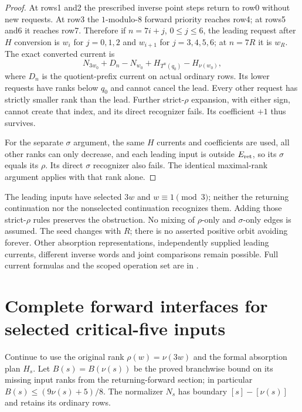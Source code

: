 \documentclass[11pt]{article}
\begin{document}
\begin{proof}
At rows1 and2 the prescribed inverse point steps return to row0 without
new requests. At row3 the $1$-modulo-$8$ forward priority reaches row4;
at rows5 and6 it reaches row7. Therefore if $n=7i+j$, $0\le j\le6$,
the leading request after $H$ conversion is $w_i$ for $j=0,1,2$ and
$w_{i+1}$ for $j=3,4,5,6$; at $n=7R$ it is $w_R$.
The exact converted current is
\[
 N_{3w_0}+D_n-N_{w_0}+H_{T^n(q_0)}-H_{\nu(w_0)},
\]
where $D_n$ is the quotient-prefix current on actual ordinary rows.
Its lower requests have ranks below $q_0$ and cannot cancel the lead.
Every other request has strictly smaller rank than the lead. Further
strict-$\rho$ expansion, with either sign, cannot create that index,
and its direct recognizer fails. Its coefficient $+1$ thus survives.

For the separate $\sigma$ argument, the same $H$ currents and coefficients
are used, all other ranks can only decrease, and each leading input is
outside $E_{\rm ret}$, so its $\sigma$ equals its $\rho$. Its direct
$\sigma$ recognizer also fails. The identical maximal-rank argument
applies with that rank alone.
\end{proof}

The leading inputs have selected $3w$ and $w\equiv1\pmod3$; neither
the returning continuation nor the nonselected continuation recognizes
them. Adding those strict-$\rho$ rules preserves the obstruction.
No mixing of $\rho$-only and $\sigma$-only edges is assumed. The seed
changes with $R$; there is no asserted positive orbit avoiding forever.
Other absorption representations, independently supplied leading currents,
different inverse words and joint comparisons remain possible. Full
current formulas and the scoped operation set are in
.

\section{Complete forward interfaces for selected critical-five inputs}
Continue to use the original rank $\rho(w)=\nu(3w)$ and the formal
absorption plan $H_s$. Let $B(s)=B(\nu(s))$ be the proved branchwise
bound on its missing input ranks from the returning-forward section;
in particular $B(s)\le(9\nu(s)+5)/8$. The normalizer $N_s$ has boundary
$[s]-[\nu(s)]$ and retains its ordinary rows.
\end{document}
